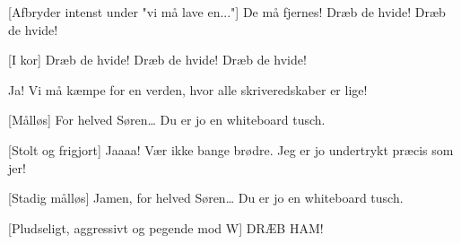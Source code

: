 \documentclass[a4paper,11pt]{article}
\begin{document}
\begin{sketch}
[Afbryder intenst under "vi må lave en..."] De må fjernes!  Dræb de hvide! Dræb de hvide!

[I kor] Dræb de hvide! Dræb de hvide! Dræb de hvide!


   Ja! Vi må kæmpe for en verden, hvor alle skriveredskaber er lige! 


[Målløs] For helved Søren…  Du er jo en whiteboard tusch.

[Stolt og frigjort] Jaaaa! Vær ikke bange brødre. Jeg er jo undertrykt præcis som jer!

[Stadig målløs] Jamen, for helved Søren…  Du er jo en whiteboard tusch.

[Pludseligt, aggressivt og pegende mod W] DRÆB HAM!



\end{sketch}
\end{document}
